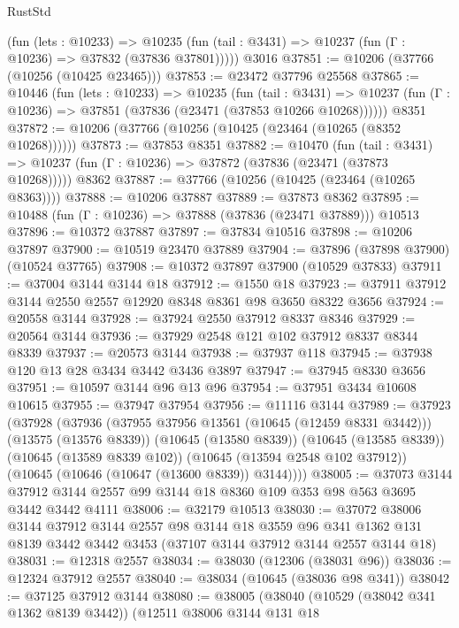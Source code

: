 \begin{lexlean}{RustStd}
\begin{coremodule}
      (fun (lets : @10233) =>
      @10235 (fun (tail : @3431) => @10237 (fun (Γ : @10236) => @37832 (@37836 @37801)))))
    @3016
@37851 := @10206 (@37766 (@10256 (@10425 @23465)))
@37853 := @23472 @37796 @25568
@37865 := @10446
    (fun (lets : @10233) =>
    @10235
      (fun (tail : @3431) =>
      @10237 (fun (Γ : @10236) => @37851 (@37836 (@23471 (@37853 @10266 @10268))))))
    @8351
@37872 := @10206 (@37766 (@10256 (@10425 (@23464 (@10265 (@8352 @10268))))))
@37873 := @37853 @8351
@37882 := @10470
    (fun (tail : @3431) => @10237 (fun (Γ : @10236) => @37872 (@37836 (@23471 (@37873 @10268)))))
    @8362
@37887 := @37766 (@10256 (@10425 (@23464 (@10265 @8363))))
@37888 := @10206 @37887
@37889 := @37873 @8362
@37895 := @10488 (fun (Γ : @10236) => @37888 (@37836 (@23471 @37889))) @10513
@37896 := @10372 @37887
@37897 := @37834 @10516
@37898 := @10206 @37897
@37900 := @10519 @23470 @37889
@37904 := @37896 (@37898 @37900) (@10524 @37765)
@37908 := @10372 @37897 @37900 (@10529 @37833)
@37911 := @37004 @3144 @3144 @18
@37912 := @1550 @18
@37923 := @37911 @37912 @3144 @2550 @2557 @12920 @8348 @8361 @98 @3650 @8322 @3656
@37924 := @20558 @3144
@37928 := @37924 @2550 @37912 @8337 @8346
@37929 := @20564 @3144
@37936 := @37929 @2548 @121 @102 @37912 @8337 @8344 @8339
@37937 := @20573 @3144
@37938 := @37937 @118
@37945 := @37938 @120 @13 @28 @3434 @3442 @3436 @3897
@37947 := @37945 @8330 @3656
@37951 := @10597 @3144 @96 @13 @96
@37954 := @37951 @3434 @10608 @10615
@37955 := @37947 @37954
@37956 := @11116 @3144
@37989 := @37923
    (@37928
      (@37936
        (@37955 @37956 @13561 (@10645 (@12459 @8331 @3442)))
        (@13575 (@13576 @8339))
        (@10645 (@13580 @8339))
        (@10645 (@13585 @8339))
        (@10645 (@13589 @8339 @102))
        (@10645 (@13594 @2548 @102 @37912))
        (@10645 (@10646 (@10647 (@13600 @8339)) @3144))))
@38005 := @37073
    @3144
    @37912
    @3144
    @2557
    @99
    @3144
    @18
    @8360
    @109
    @353
    @98
    @563
    @3695
    @3442
    @3442
    @4111
@38006 := @32179 @10513
@38030 := @37072
    @38006
    @3144
    @37912
    @3144
    @2557
    @98
    @3144
    @18
    @3559
    @96
    @341
    @1362
    @131
    @8139
    @3442
    @3442
    @3453
    (@37107 @3144 @37912 @3144 @2557 @3144 @18)
@38031 := @12318 @2557
@38034 := @38030 (@12306 (@38031 @96))
@38036 := @12324 @37912 @2557
@38040 := @38034 (@10645 (@38036 @98 @341))
@38042 := @37125 @37912 @3144
@38080 := @38005
    (@38040
      (@10529 (@38042 @341 @1362 @8139 @3442))
      (@12511
        @38006
        @3144
        @131
        @18

\end{coremodule}
\end{lexlean}
